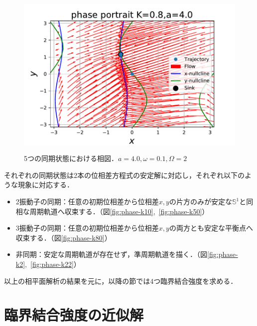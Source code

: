 \documentclass[../main]{subfiles}
\begin{document}
\begin{figure}[t]
\begin{minipage}[b]{0.47\linewidth}
      \includegraphics[keepaspectratio, scale=0.42]{images/phase_a4K80.pdf}
      \label{fig:phase-k80}
    \end{minipage}
    \caption{5つの同期状態における相図．$a=4.0,\omega=0.1,\Omega=2$}\label{fig:phase}
\end{figure}

それぞれの同期状態は2本の位相差方程式の安定解に対応し，それぞれ以下のような現象に対応する．
\begin{itemize}
    \item 
    2振動子の同期：任意の初期位相差から位相差$x,y$の片方のみが安定な$\mathbb{S}^1$と同相な周期軌道へ収束する．（図\ref{fig:phase-k10},\ \ref{fig:phase-k50}）
    \item
    3振動子の同期：任意の初期位相差から位相差$x,y$の両方とも安定な平衡点へ収束する．（図\ref{fig:phase-k80}）
    \item
    非同期：安定な周期軌道が存在せず，準周期軌道を描く．（図\ref{fig:phase-k2},\ \ref{fig:phase-k22}）
\end{itemize}
以上の相平面解析の結果を元に，以降の節では4つ臨界結合強度を求める．
\section{臨界結合強度の近似解}
\end{document}
